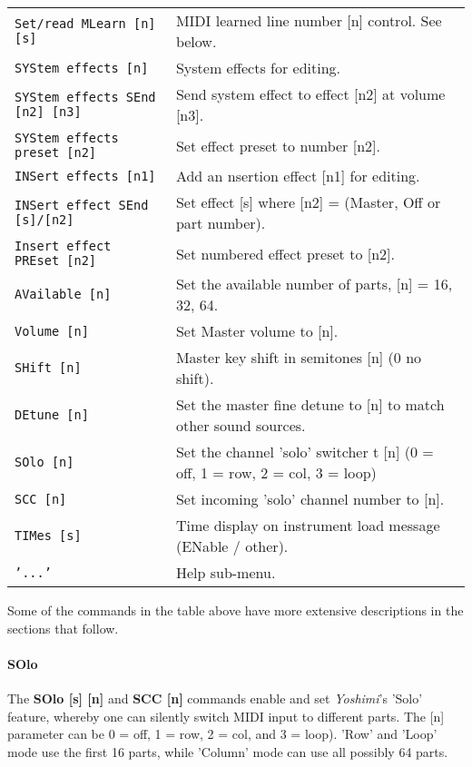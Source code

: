 \begin{center}
\begin{longtable}{p{6cm} p{10cm}}
\texttt{Set/read MLearn [n] [s]} &
   MIDI learned line number [n] control.  See below. \\
\texttt{SYStem effects [n]} &
   System effects for editing. \\
\texttt{SYStem effects SEnd [n2] [n3]} &
   Send system effect to effect [n2] at volume [n3]. \\
\texttt{SYStem effects preset [n2]} &
   Set effect preset to number [n2]. \\
\texttt{INSert effects [n1]} &
   Add an nsertion effect [n1] for editing. \\
\texttt{INSert effect SEnd [s]/[n2]} &
   Set effect [s] where [n2] = (Master, Off or part number). \\
\texttt{Insert effect PREset [n2]} &
   Set numbered effect preset to [n2]. \\
\texttt{AVailable [n]} &
   Set the available number of parts, [n] = 16, 32, 64. \\
\texttt{Volume [n]} &
   Set Master volume to [n]. \\
\texttt{SHift [n]} &
   Master key shift in semitones [n] (0 no shift). \\
\texttt{DEtune [n]} &
   Set the master fine detune to [n] to match other sound sources. \\
\texttt{SOlo [n]} &
   Set the channel 'solo' switcher t [n]
   (0 = off, 1 = row, 2 = col, 3 = loop) \\
\texttt{SCC [n]} &
   Set incoming 'solo' channel number to [n]. \\
\texttt{TIMes [s]} &
   Time display on instrument load message (ENable / other). \\
\texttt{'...'} &
   Help sub-menu. \\

\end{longtable}
\end{center}


   Some of the commands in the table above have more extensive descriptions in
   the sections that follow.

\paragraph{SOlo}
\label{paragraph:command_line_solo}

   The \textbf{SOlo [s] [n]} and \textbf{SCC [n]}
   commands enable and set \textsl{Yoshimi}'s 'Solo' feature,
   whereby one can silently switch MIDI input to different parts.
   The [n] parameter can be 0 = off, 1 = row, 2 = col, and 3 = loop).
   'Row' and 'Loop' mode use the first 16 parts, while
   'Column' mode can use all possibly 64 parts.

